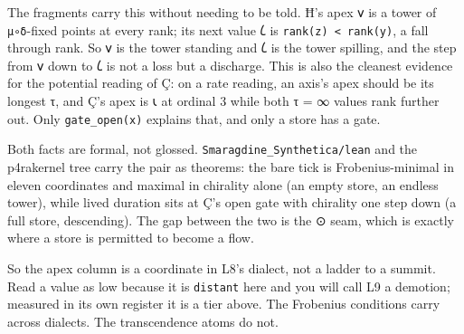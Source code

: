 \documentclass[12pt,a4paper]{article}
\begin{document}
\begin{enumerate}
  The fragments carry this without needing to be told. Ħ's apex 𐑫 is a
  tower of \texttt{μ∘δ}-fixed points at every rank; its next value 𐑖 is
  \texttt{rank(z)\ \textless{}\ rank(y)}, a fall through rank. So 𐑫 is
  the tower standing and 𐑖 is the tower spilling, and the step from 𐑫
  down to 𐑖 is not a loss but a discharge. This is also the cleanest
  evidence for the potential reading of Ç: on a rate reading, an axis's
  apex should be its longest τ, and Ç's apex is 𐑧 at ordinal 3 while
  both τ = ∞ values rank further out. Only \texttt{gate\_open(x)}
  explains that, and only a store has a gate.

  Both facts are formal, not glossed.
  \texttt{Smaragdine\_Synthetica/lean} and the p4rakernel tree carry the
  pair as theorems: the bare tick is Frobenius-minimal in eleven
  coordinates and maximal in chirality alone (an empty store, an endless
  tower), while lived duration sits at Ç's open gate with chirality one
  step down (a full store, descending). The gap between the two is the ⊙
  seam, which is exactly where a store is permitted to become a flow.

  So the apex column is a coordinate in L8's dialect, not a ladder to a
  summit. Read a value as low because it is \texttt{distant} here and
  you will call L9 a demotion; measured in its own register it is a tier
  above. The Frobenius conditions carry across dialects. The
  transcendence atoms do not.
\end{enumerate}
\end{document}

